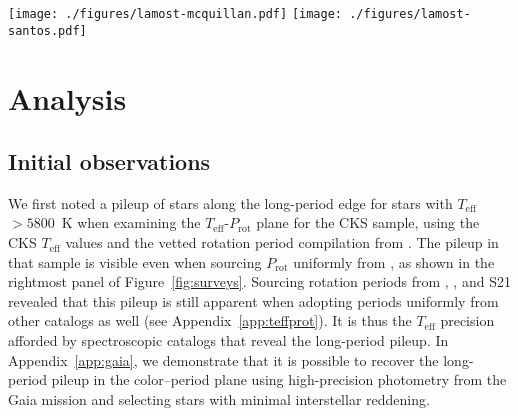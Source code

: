 \documentclass[trackchanges,twocolumn]{aastex631}
\newcommand{\lamostmcq}{LAMOST--McQuillan\xspace}
\newcommand{\lamostsan}{LAMOST--Santos\xspace}
\newcommand{\santos}{S21\xspace}
\newcommand{\teff}{\ensuremath{T_{\mathrm{eff}}}\xspace}
\newcommand{\logg}{\ensuremath{\log g}\xspace}
\newcommand{\prot}{\ensuremath{P_\mathrm{rot}}\xspace}
\begin{document}
\begin{figure*}
    \centering
    \texttt{[image: ./figures/lamost-mcquillan.pdf]}
    \texttt{[image: ./figures/lamost-santos.pdf]}
    \caption{Two-dimensional histograms indicating the number of Kepler target stars in the \teff–\prot plane for the \lamostmcq sample (top row) and the \lamostsan sample (bottom row). The effects of a simple cut in \logg to separate subgiants and dwarfs are shown in the middle and right columns. In each panel the Sun is indicated by the orange point, with an errorbar reflecting the range of periods measured from the activity belts. The long-period pileup for dwarf stars is clearly seen to extend to the solar temperature. The short-period pileup is clearer in the smaller \lamostmcq dwarf sample, potentially because the \santos catalog detected more stars at longer periods. The secondary overdensity observed in the subgiant samples, most visible in the bottom center panel, appears to be at twice the period of the primary overdensity, potentially due to erroneously determined rotation periods.}
    \label{fig:xmatch}
\end{figure*}


\section{Analysis}
\label{sec:analysis}

\subsection{Initial observations}
We first noted a pileup of stars along the long-period edge for stars with \teff~$>5800$~K when examining the \teff-\prot plane for the CKS sample, using the CKS \teff values and the vetted rotation period compilation from \citet{David2021}. The pileup in that sample is visible even when sourcing \prot uniformly from \citet{McQuillan2013}, as shown in the rightmost panel of Figure~\ref{fig:surveys}. Sourcing rotation periods from \citet{Mazeh2015}, \citet{Angus2018}, and \santos revealed that this pileup is still apparent when adopting periods uniformly from other catalogs as well (see Appendix~\ref{app:teffprot}). It is thus the \teff precision afforded by spectroscopic catalogs that reveal the long-period pileup. In Appendix~\ref{app:gaia}, we demonstrate that it is possible to recover the long-period pileup in the color–period plane using high-precision photometry from the Gaia mission \citep{Gaia2016} and selecting stars with minimal interstellar reddening.
\end{document}
